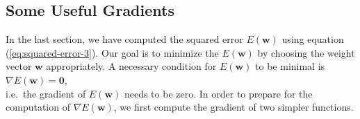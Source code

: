 \subsection{Some Useful Gradients}
In the last section, we have computed the squared error $E(\mathbf{w})$ using equation
(\ref{eq:squared-error-3}).  Our goal is to minimize the $E(\mathbf{w})$ by choosing the weight
vector $\mathbf{w}$ appropriately.  A necessary condition for $E(\mathbf{w})$ to be minimal is 
\\[0.2cm]
\hspace*{1.3cm}
$\nabla E(\mathbf{w}) = \mathbf{0}$,
\\[0.2cm]
i.e.~the gradient of $E(\mathbf{w})$ needs to be zero.  In order to prepare for the computation of
$\nabla E(\mathbf{w})$, we first compute the gradient of two simpler functions.


